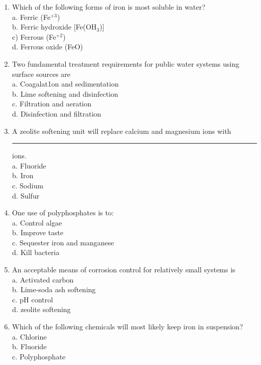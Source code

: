 \begin{enumerate}
\item Which of the following forms of iron is most soluble in water?\\
a. Ferric (Fe$^{+3}$)\\
b. Ferric hydroxide [Fe(OH$_3$)]\\
c) Ferrous (Fe$^{+2}$)\\
d. Ferrous oxide (FeO)\\

\item Two fundamental treatment requirements for public water systems using surface sources are\\
a. Coagalat1on and sedimentation\\
b. Lime softening and disinfection\\
c. Filtration and aeration \\
d. Disinfection and filtration

\item A zeolite softening unit will replace calcium and magnesium ions with \rule{1.5cm}{0.3mm} ions.\\
a. Fluoride\\
b. Iron\\
c. Sodium\\
d. Sulfur\\

\item One use of polyphosphates is to:\\
a. Control algae\\
b. Improve taste\\
c. Sequester iron and manganese\\
d. Kill bacteria

\item An acceptable means of corrosion control for relatively small systems is\\
a. Activated carbon\\
b. Lime-soda ash softening\\
c. pH control\\
d. zeolite softening



\item Which of the following chemicals will most likely keep iron in suspension?\\


a. Chlorine\\

b. Fluoride\\

c. Polyphosphate\\


\end{enumerate}

